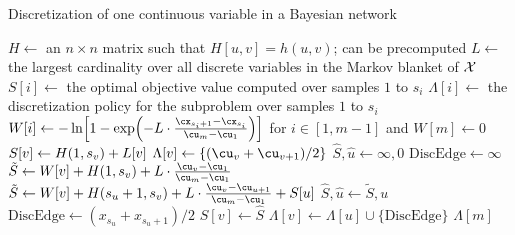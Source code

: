 \begin{algorithm}
  \caption{Discretization of one continuous variable in a Bayesian network}
  \label{alg:disc_one}
  \begin{algorithmic}[5]
      \State $H \leftarrow$ an $n \times n$ matrix such that $H[u,v] = h(u,v)$; can be precomputed
      \State $L \leftarrow$ the largest cardinality over all discrete variables in the Markov blanket of $\mathcal{X}$
      \State $S[i] \leftarrow$ the optimal objective value computed over samples $1$ to $s_i$
      \State $\Lambda[i] \leftarrow$ the discretization policy for the subproblem over samples $1$ to $s_i$
      \State $W[i]  \leftarrow - \ln\brock{1 - {\exp\paren{- L \cdot{ {{\cx_{s_i+1} - \cx_{s_i}}\over{\cu_m - \cu_1}}}}}}$ for $i \in [1,m-1]$ and $W[m] \leftarrow 0$
          \State $S[v] \leftarrow H \paren{1,s_v} + L[v]$
          \State $\Lambda[v] \leftarrow \curly{({\cu_v + \cu_{v+1}}) / 2}$
        \Else
          \State $\hat{S}, \hat{u} \leftarrow \infty, 0$
          \State $\text{DiscEdge} \leftarrow \infty$
              \State $\tilde{S} \leftarrow W[v] + H \paren{1, s_v} +  {L \cdot {\frac{\cu_{v} - \cu_1}{\cu_m - \cu_1}}}$
            \Else
              \State $\tilde{S} \leftarrow W[v] + H \paren{s_u+1, s_v} +  {L \cdot {\frac{\cu_{v} - \cu_{u + 1}}{\cu_m - \cu_1}}} + S[u]$
            \EndIf
              \State $\hat{S}, \hat{u} \leftarrow \tilde{S}, u$
              \State $\text{DiscEdge} \leftarrow ({x_{s_u} + x_{s_u+1}}) / 2$
            \EndIf
          \EndFor
          \State $S[v] \leftarrow \hat{S}$
          \State $\Lambda[v] \leftarrow \Lambda[u] \cup \{ \text{DiscEdge} \}$
        \EndIf
      \EndFor
      \State \Return $\Lambda[m]$
    \EndFunction
  \end{algorithmic}
\end{algorithm}



